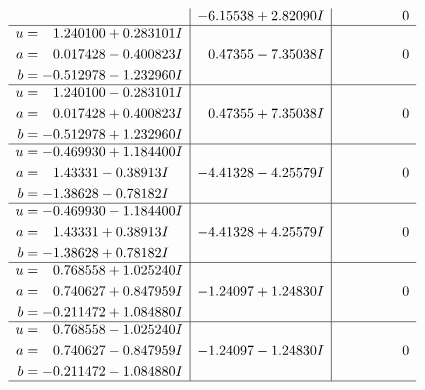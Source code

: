\documentclass[1p]{elsarticle_modified}
\theoremstyle{definition}
\begin{document}
$$\begin{array}{c|c|c}
 & -6.15538 + 2.82090 I & \phantom{-0.000000 } 0 \\ \hline\begin{aligned}
u &= \phantom{-}1.240100 + 0.283101 I \\
a &= \phantom{-}0.017428 - 0.400823 I \\
b &= -0.512978 - 1.232960 I\end{aligned}
 & \phantom{-}0.47355 - 7.35038 I & \phantom{-0.000000 } 0 \\ \hline\begin{aligned}
u &= \phantom{-}1.240100 - 0.283101 I \\
a &= \phantom{-}0.017428 + 0.400823 I \\
b &= -0.512978 + 1.232960 I\end{aligned}
 & \phantom{-}0.47355 + 7.35038 I & \phantom{-0.000000 } 0 \\ \hline\begin{aligned}
u &= -0.469930 + 1.184400 I \\
a &= \phantom{-}1.43331 - 0.38913 I \\
b &= -1.38628 - 0.78182 I\end{aligned}
 & -4.41328 - 4.25579 I & \phantom{-0.000000 } 0 \\ \hline\begin{aligned}
u &= -0.469930 - 1.184400 I \\
a &= \phantom{-}1.43331 + 0.38913 I \\
b &= -1.38628 + 0.78182 I\end{aligned}
 & -4.41328 + 4.25579 I & \phantom{-0.000000 } 0 \\ \hline\begin{aligned}
u &= \phantom{-}0.768558 + 1.025240 I \\
a &= \phantom{-}0.740627 + 0.847959 I \\
b &= -0.211472 + 1.084880 I\end{aligned}
 & -1.24097 + 1.24830 I & \phantom{-0.000000 } 0 \\ \hline\begin{aligned}
u &= \phantom{-}0.768558 - 1.025240 I \\
a &= \phantom{-}0.740627 - 0.847959 I \\
b &= -0.211472 - 1.084880 I\end{aligned}
 & -1.24097 - 1.24830 I & \phantom{-0.000000 } 0\\
 \hline 
 \end{array}$$\newpage$$\begin{array}{c|c|c}  

\end{array}$$
\end{document}
